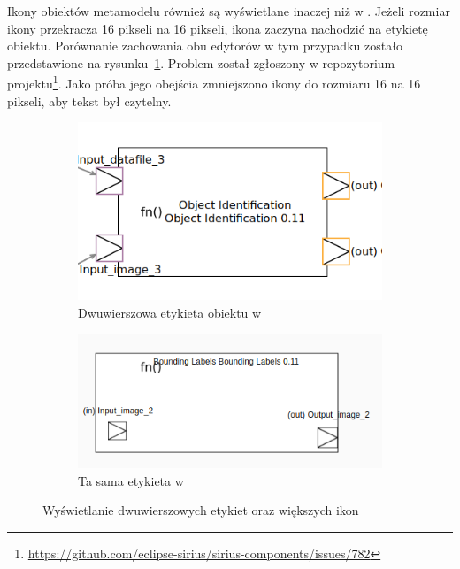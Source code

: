 Ikony obiektów metamodelu również są wyświetlane inaczej niż w
\SiriusDesktop{}. Jeżeli rozmiar ikony przekracza 16 pikseli na 16 pikseli,
ikona
zaczyna nachodzić na etykietę obiektu. Porównanie zachowania obu edytorów w
tym przypadku zostało przedstawione na
rysunku~\ref{rys:sirius-multiline-labels}. Problem został zgłoszony w
repozytorium projektu\footnote{
	\url{https://github.com/eclipse-sirius/sirius-components/issues/782}
}. Jako próba jego obejścia zmniejszono ikony do rozmiaru 16 na 16 pikseli, aby
tekst był czytelny.

\begin{figure}
	\centering
	\begin{subfigure}{.49\textwidth}
		\centering
    \includegraphics[width=.8\linewidth]{./images/sirius-desktop-multiline-label.png}
		\caption{Dwuwierszowa etykieta obiektu w \SiriusDesktop{}}
	\end{subfigure}
	\begin{subfigure}{.49\textwidth}
		\centering
		\includegraphics[width=.99\linewidth]{./images/sirius-web-multiline-label.png}
		\caption{Ta sama etykieta w \SiriusWeb{}}
	\end{subfigure}

    \caption{Wyświetlanie dwuwierszowych
      etykiet oraz większych ikon}\label{rys:sirius-multiline-labels}
\end{figure}

